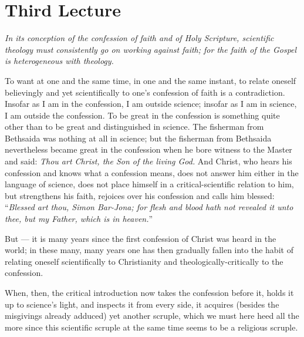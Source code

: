 \documentclass[12pt,a4paper]{book}
\begin{document}
\chapter*{Third Lecture}
\label{ch:forel3}

\begin{center}\itshape
In its conception of the confession of faith and of Holy Scripture,
scientific theology must consistently go on working against faith;
for the faith of the Gospel is heterogeneous with theology.
\end{center}

To want at one and the same time, in one and the same instant, to relate oneself
believingly and yet scientifically to one's confession of faith is a
contradiction. Insofar as I am in the confession, I am outside science; insofar
as I am in science, I am outside the confession. To be great in the confession
is something quite other than to be great and distinguished in science. The
fisherman from Bethsaida was nothing at all in science; but the fisherman from
Bethsaida nevertheless became great in the confession when he bore witness to
the Master and said: \emph{Thou art Christ, the Son of the living God.} And
Christ, who hears his confession and knows what a confession means, does not
answer him either in the language of science, does not place himself in a
critical-scientific relation to him, but strengthens his faith, rejoices over
his confession and calls him blessed: ``\emph{Blessed art thou, Simon
Bar-Jona; for flesh and blood hath not revealed it unto thee, but my Father,
which is in heaven.}''

But --- it is many years since the first confession of Christ was heard in the
world; in these many, many years one has then gradually fallen into the habit of
relating oneself scientifically to Christianity and theologically-critically to
the confession.

When, then, the critical introduction now takes the confession before it, holds
it up to science's light, and inspects it from every side, it acquires (besides
the misgivings already adduced) yet another scruple, which we must here heed all
the more since this scientific scruple at the same time seems to be a religious
scruple.
\end{document}
